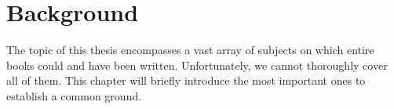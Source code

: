 \chapter{Background}

The topic of this thesis encompasses a vast array of subjects on which entire books could and have been written. Unfortunately, we cannot thoroughly cover all of them. This chapter will briefly introduce the most important ones to establish a common ground.





